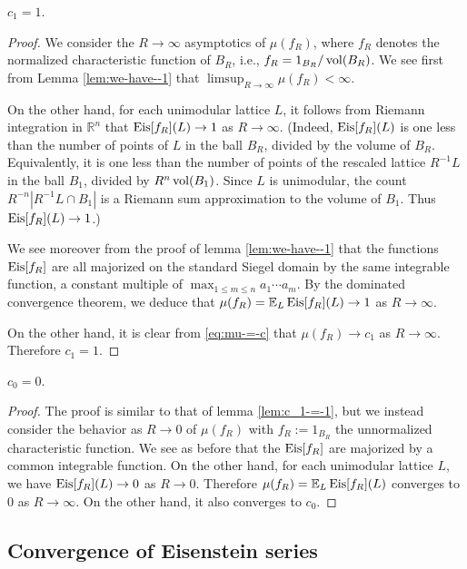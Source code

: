 \documentclass[reqno]{amsart} 
\begin{document}
\begin{lemma}\label{lem:c_1-=-1}
  $c_1 = 1$.
\end{lemma}
\begin{proof}
  We consider the $R \rightarrow \infty$ asymptotics of $\mu(f_R)$, where $f_R$ denotes the normalized characteristic function of $B_R$, i.e., $f_R = 1_{B_R} / \operatorname{vol}(B_R)$.  We see first from Lemma \ref{lem:we-have--1} that $\limsup_{R \rightarrow \infty} \mu(f_R) < \infty$.

  On the other hand, for each unimodular lattice $L$, it follows from Riemann integration in $\mathbb{R}^n$ that $\operatorname{Eis}[f_R](L) \rightarrow 1$ as $R \rightarrow \infty$.  (Indeed, $\operatorname{Eis}[f_R](L)$ is one less than the number of points of $L$ in the ball $B_R$, divided by the volume of $B_R$.  Equivalently, it is one less than the number of points of the rescaled lattice $R^{-1} L$ in the ball $B_1$, divided by $R^n \operatorname{vol}(B_1)$.  Since $L$ is unimodular, the count $R^{-n} | R^{-1} L \cap B_1 |$ is a Riemann sum approximation to the volume of $B_1$.  Thus $\operatorname{Eis}[f_R](L) \rightarrow 1$.)

  We see moreover from the proof of lemma \ref{lem:we-have--1} that the functions $\operatorname{Eis}[f_R]$ are all majorized on the standard Siegel domain by the same integrable function, a constant multiple of $\max_{1 \leq m \leq n} a_1 \dotsb a_m$.  By the dominated convergence theorem, we deduce that $\mu(f_R) = \mathbb{E}_{L} \operatorname{Eis}[f_R](L) \rightarrow 1$ as $R \rightarrow \infty$.

  On the other hand, it is clear from \eqref{eq:mu-=-c} that $\mu(f_R) \rightarrow c_1$ as $R \rightarrow \infty$.  Therefore $c_1 = 1$.
\end{proof}

\begin{lemma}
  $c_0 = 0$.
\end{lemma}
\begin{proof}
  The proof is similar to that of lemma \ref{lem:c_1-=-1}, but we instead consider the behavior as $R \rightarrow 0$ of $\mu(f_R)$ with $f_R := 1_{B_R}$ the unnormalized characteristic function.  We see as before that the $\operatorname{Eis}[f_R]$ are majorized by a common integrable function.  On the other hand, for each unimodular lattice $L$, we have $\operatorname{Eis}[f_R](L) \rightarrow 0$ as $R \rightarrow 0$.  Therefore $\mu(f_R) = \mathbb{E}_L \operatorname{Eis}[f_R](L)$ converges to $0$ as $R \rightarrow \infty$.  On the other hand, it also converges to $c_0$.
\end{proof}


\subsection{Convergence of Eisenstein series}\label{sec:conv-eisenst-seri}
\end{document}
